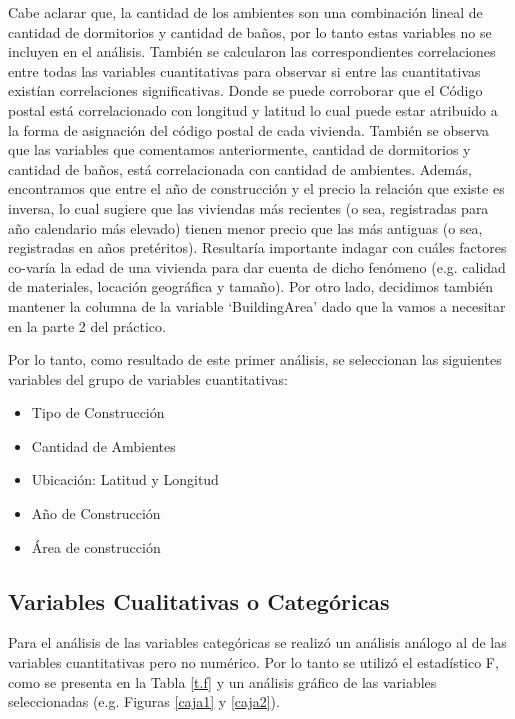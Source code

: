 Cabe aclarar que, la cantidad de los ambientes son una combinación lineal de cantidad de dormitorios y cantidad de baños, por lo tanto estas variables no se incluyen en el análisis. 
También se calcularon las correspondientes correlaciones entre todas las variables cuantitativas para observar si entre las cuantitativas existían correlaciones significativas. Donde se puede corroborar que el Código postal está correlacionado con longitud y latitud lo cual puede estar atribuido a la forma de asignación del código postal de cada vivienda. También se observa que las variables que comentamos anteriormente, cantidad de dormitorios y cantidad de baños, está correlacionada con cantidad de ambientes.
Además, encontramos que entre el año de construcción y el precio la relación que existe es inversa, lo cual sugiere que las viviendas más recientes (o sea, registradas para año calendario más elevado) tienen menor precio que las más antiguas (o sea, registradas en años pretéritos). Resultaría importante indagar con cuáles factores co-varía la edad de una vivienda para dar cuenta de dicho fenómeno (e.g. calidad de materiales, locación geográfica y tamaño). 
Por otro lado, decidimos también mantener la columna de la variable `BuildingArea' dado que la vamos a necesitar en la parte 2 del práctico.

Por lo tanto, como resultado de este primer análisis, se seleccionan las siguientes variables del grupo de variables cuantitativas:

\begin{itemize}
\item Tipo de Construcción
\item Cantidad de Ambientes
\item Ubicación: Latitud y Longitud
\item Año de Construcción
\item Área de construcción
\end{itemize}


\subsection*{Variables Cualitativas o Categóricas}

Para el análisis de las variables categóricas se realizó un análisis análogo al de las variables cuantitativas pero no numérico. Por lo tanto se utilizó el estadístico F, como se presenta en la Tabla \ref{t.f} y un análisis gráfico de las variables seleccionadas (e.g. Figuras \ref{caja1} y \ref{caja2}).

